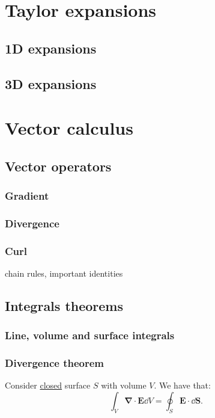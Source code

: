 \documentclass{article}
\begin{document}
\newpage

\section{Taylor expansions}

\subsection{1D expansions}

\newpage

\subsection{3D expansions}

\newpage

\section{Vector calculus}

\subsection{Vector operators}

\subsubsection{Gradient}

\subsubsection{Divergence}

\subsubsection{Curl}

chain rules, important identities

\subsection{Integrals theorems}

\subsubsection{Line, volume and surface integrals}

\subsubsection{Divergence theorem}
Consider \underline{closed} surface $S$
with volume $V$. We have that:
$$\int_V\boldsymbol{\nabla}\cdot\boldsymbol{E}\dd V
=\oint_S\boldsymbol{E}\cdot\dd\boldsymbol{S}.$$
\end{document}
